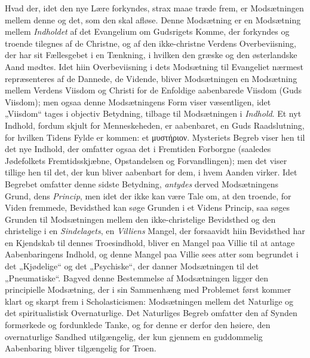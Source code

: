 \documentclass[12pt,a4paper]{book}
\newcommand{\opage}[1]{\marginnote{\footnotesize\textit{[#1]}}}
\begin{document}
\noindent Hvad der, idet den nye Lære forkyndes, strax maae træde frem, er
Modsætningen mellem denne og det, som den skal afløse. Denne Modsætning er en
Modsætning mellem \emph{Indholdet} af det Evangelium om Gudsrigets Komme, der
forkyndes og troende tilegnes af de Christne, og af den ikke-christne Verdens
Overbeviisning, der har sit Fællesgebet i en Tænkning, i hvilken den græske og
den østerlandske Aand mødtes. Idet hiin Overbeviisning i dets Modsætning til
Evangeliet nærmest repræsenteres af de Dannede, de Vidende, bliver
Modsætningen en Modsætning mellem Verdens Viisdom og Christi for de Enfoldige
aabenbarede Viisdom (Guds Viisdom); men ogsaa denne Modsætningens Form viser
væsentligen, idet „Viisdom“ tages i objectiv Betydning, tilbage til Modsætningen i \emph{Indhold}. Et nyt Indhold, fordum skjult for Menneskeheden, er
aabenbaret, en Guds Raadslutning, for hvilken Tidens Fylde er kommen: et
μυστήριον. Mysteriets Begreb viser hen til det nye Indhold, der omfatter ogsaa
det i Fremtiden Forborgne (saaledes Jødefolkets Fremtidsskjæbne, Opstandelsen
og Forvandlingen); men det viser tillige hen til det, der kun bliver aabenbart
for dem, i hvem Aanden virker. Idet Begrebet omfatter denne sidste Betydning,
\emph{antydes} derved Modsætningens Grund, dens \emph{Princip}, men idet der ikke kan være
Tale om, at den troende, for Viden fremmede, Bevidsthed kan søge Grunden i et
Videns Princip, saa søges Grunden til Modsætningen mellem den ikke-christelige
Bevidsthed og den christelige i en \emph{Sindelagets}, en \emph{Villiens} Mangel, der
forsaavidt hiin \opage{16}Bevidsthed har en Kjendskab til dennes Troesindhold, bliver en
Mangel paa Villie til at antage Aabenbaringens Indhold, og denne Mangel paa
Villie sees atter som begrundet i det „Kjødelige“ og det „Psychiske“, der
danner Modsætningen til det „Pneumatiske“. Bagved denne Bestemmelse af
Modsætningen ligger den principielle Modsætning, der i sin Sammenhæng med
Problemet først kommer klart og skarpt frem i Scholasticismen: Modsætningen
mellem det Naturlige og det spiritualistisk Overnaturlige. Det Naturliges
Begreb omfatter den af Synden formørkede og fordunklede Tanke, og for denne er
derfor den høiere, den overnaturlige Sandhed utilgængelig, der kun gjennem en
guddommelig Aabenbaring bliver tilgængelig for Troen.
\end{document}
